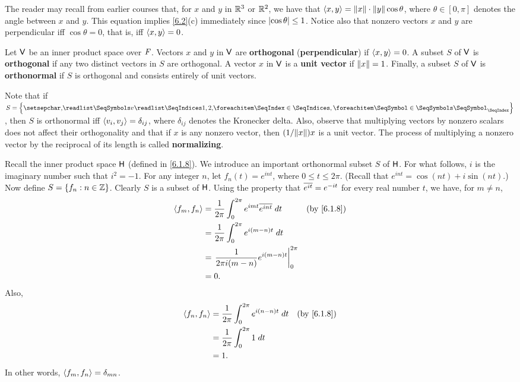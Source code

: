 \begin{note}
	The reader may recall from earlier courses that, for \(x\) and \(y\) in \(\mathbb{R}^3\) or \(\mathbb{R}^2\), we have that \(\left\langle x, y\right\rangle = \left\lVert x\right\rVert \cdot \left\lVert y\right\rVert \cos \theta\), where \(\theta \in [0, \pi]\) denotes the angle between \(x\) and \(y\).
	This equation implies \cref{6.2}(c) immediately since \(\left\lvert\cos \theta\right\rvert \leq 1\).
	Notice also that nonzero vectors \(x\) and \(y\) are perpendicular iff \(\cos \theta = 0\), that is, iff \(\left\langle x, y\right\rangle = 0\).
\end{note}

\begin{defn}\label{6.1.12}
	Let \(\mathsf{V}\) be an inner product space over \(\mathit{F}\).
	Vectors \(x\) and \(y\) in \(\mathsf{V}\) are \textbf{orthogonal} (\textbf{perpendicular}) if \(\left\langle x, y\right\rangle = 0\).
	A subset \(S\) of \(\mathsf{V}\) is \textbf{orthogonal} if any two distinct vectors in \(S\) are orthogonal.
	A vector \(x\) in \(\mathsf{V}\) is a \textbf{unit vector} if \(\left\lVert x\right\rVert = 1\).
	Finally, a subset \(S\) of \(\mathsf{V}\) is \textbf{orthonormal} if \(S\) is orthogonal and consists entirely of unit vectors.

	Note that if \(S = \set{\seq{v}{1,2,}}\), then \(S\) is orthonormal iff \(\left\langle v_i, v_j\right\rangle = \delta_{i j}\), where \(\delta_{i j}\) denotes the Kronecker delta.
	Also, observe that multiplying vectors by nonzero scalars does not affect their orthogonality and that if \(x\) is any nonzero vector, then \((1 / \norm{x}) x\) is a unit vector.
	The process of multiplying a nonzero vector by the reciprocal of its length is called \textbf{normalizing}.
\end{defn}

\begin{eg}\label{6.1.13}
	Recall the inner product space \(\mathsf{H}\) (defined in \cref{6.1.8}).
	We introduce an important orthonormal subset \(S\) of \(\mathsf{H}\).
	For what follows, \(i\) is the imaginary number such that \(i^2 = -1\).
	For any integer \(n\), let \(f_n(t) = e^{int}\), where \(0 \leq t \leq 2 \pi\).
	(Recall that \(e^{int} = \cos(nt) + i \sin(nt)\).)
	Now define \(S = \left\lbrace f_n : n \in \mathbb{Z}\right\rbrace\).
	Clearly \(S\) is a subset of \(\mathsf{H}\).
	Using the property that \(\overline{e^{it}} = e^{-it}\) for every real number \(t\), we have, for \(m \neq n\),
	\begin{align*}
		\inn{f_m, f_n} & = \frac{1}{2 \pi} \int_0^{2 \pi} e^{imt} \conj{e^{int}} \; dt &  & \by{6.1.8} \\
		               & = \frac{1}{2 \pi} \int_0^{2 \pi} e^{i(m - n)t} \; dt                          \\
		               & = \eval{\frac{1}{2 \pi i(m - n)} e^{i(m - n)t}}_0^{2 \pi}                     \\
		               & = 0.
	\end{align*}
	Also,
	\begin{align*}
		\inn{f_n, f_n} & = \frac{1}{2 \pi} \int_0^{2 \pi} e^{i(n - n)t} \; dt &  & \by{6.1.8} \\
		               & = \frac{1}{2 \pi} \int_0^{2 \pi} 1 \; dt                             \\
		               & = 1.
	\end{align*}
	In other words, \(\left\langle f_m, f_n\right\rangle = \delta_{m n}\).
\end{eg}

